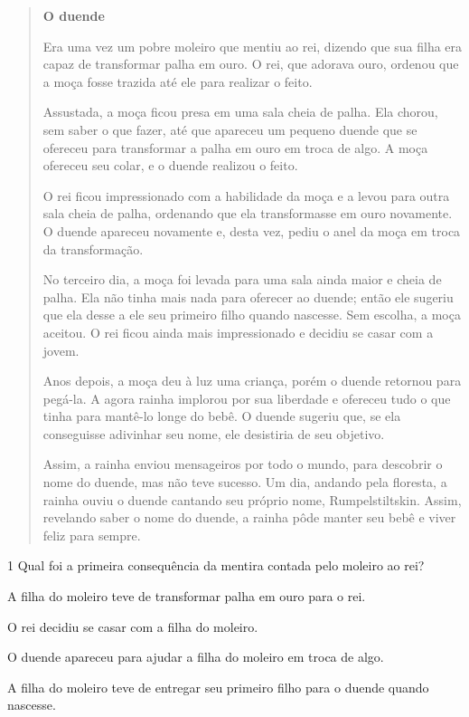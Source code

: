 \begin{quote}
\textbf{O duende}

Era uma vez um pobre moleiro que mentiu ao rei, dizendo que sua filha
era capaz de transformar palha em ouro. O rei, que adorava ouro, ordenou
que a moça fosse trazida até ele para realizar o feito.

Assustada, a moça ficou presa em uma sala cheia de palha. Ela chorou,
sem saber o que fazer, até que apareceu um pequeno duende que se
ofereceu para transformar a palha em ouro em troca de algo. A moça
ofereceu seu colar, e o duende realizou o feito.

O rei ficou impressionado com a habilidade da moça e a levou para outra
sala cheia de palha, ordenando que ela transformasse em ouro novamente.
O duende apareceu novamente e, desta vez, pediu o anel da moça em troca
da transformação.

No terceiro dia, a moça foi levada para uma sala ainda maior e cheia de
palha. Ela não tinha mais nada para oferecer ao duende; então ele
sugeriu que ela desse a ele seu primeiro filho quando nascesse. Sem
escolha, a moça aceitou. O rei ficou ainda mais impressionado e decidiu
se casar com a jovem.

Anos depois, a moça deu à luz uma criança, porém o duende retornou para
pegá-la. A agora rainha implorou por sua liberdade e ofereceu tudo o que
tinha para mantê-lo longe do bebê. O duende sugeriu que, se ela
conseguisse adivinhar seu nome, ele desistiria de seu objetivo.

Assim, a rainha enviou mensageiros por todo o mundo, para descobrir o
nome do duende, mas não teve sucesso. Um dia, andando pela floresta, a
rainha ouviu o duende cantando seu próprio nome, Rumpelstiltskin. Assim,
revelando saber o nome do duende, a rainha pôde manter seu bebê e viver
feliz para sempre.

\end{quote}

\num{1} Qual foi a primeira consequência da mentira contada pelo moleiro ao rei?

\begin{escolha}
\item A filha do moleiro teve de transformar palha em ouro para o rei.

\item O rei decidiu se casar com a filha do moleiro.

\item O duende apareceu para ajudar a filha do moleiro em troca de algo.

\item A filha do moleiro teve de entregar seu primeiro filho para o duende quando nascesse.
\end{escolha}

